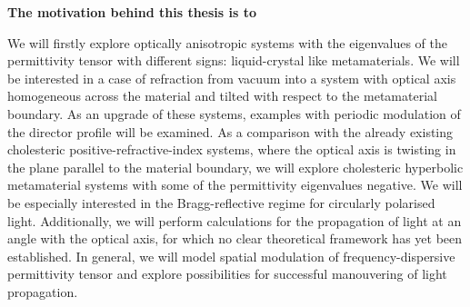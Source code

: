 \documentclass[a4paper,11pt]{article}
\begin{document}
{ \bfseries
The motivation behind this thesis is to 

% 
% 
% 
% 

}



We will firstly explore optically anisotropic systems with the eigenvalues of the permittivity tensor with different signs: liquid-crystal like metamaterials. 
We will be interested in a case of refraction from vacuum into a system with optical axis homogeneous across the material and tilted with respect to the metamaterial boundary. 
As an upgrade of these systems, examples with periodic modulation of the director profile will be examined. 
As a comparison with the already existing cholesteric positive-refractive-index systems, where the optical axis is twisting in the plane parallel to the material boundary, we will explore cholesteric hyperbolic metamaterial systems with some of the permittivity eigenvalues negative.
We will be especially interested in the Bragg-reflective regime for circularly polarised light. 
Additionally, we will perform calculations for the propagation of light at an angle with the optical axis, for which no clear theoretical framework has yet been established. 
In general, we will model spatial modulation of frequency-dispersive permittivity tensor and explore possibilities for successful manouvering of light propagation.  


\end{document}
